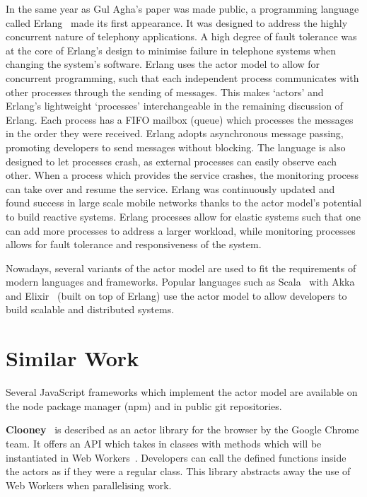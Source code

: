 \documentclass[12pt, a4paper]{report}
\theoremstyle{definition}
\theoremstyle{definition}%
\theoremstyle{definition}%
\theoremstyle{definition}%
\theoremstyle{definition}%
\theoremstyle{definition}%
\begin{document}
In the same year as Gul Agha's paper was made public, a programming language called Erlang~\cite{erlang} made its first appearance. It was designed to address the highly concurrent nature of telephony applications. A high degree of fault tolerance was at the core of Erlang's design to minimise failure in telephone systems when changing the system's software. Erlang uses the actor model to allow for concurrent programming, such that each independent process communicates with other processes through the sending of messages. This makes `actors' and Erlang's lightweight `processes' interchangeable in the remaining discussion of Erlang. Each process has a FIFO mailbox (queue) which processes the messages in the order they were received. Erlang adopts asynchronous message passing, promoting developers to send messages without blocking. The language is also designed to let processes crash, as external processes can easily observe each other. When a process which provides the service crashes, the monitoring process can take over and resume the service. Erlang was continuously updated and found success in large scale mobile networks thanks to the actor model's potential to build reactive systems\cite{reactivemanifesto}. Erlang processes allow for elastic systems such that one can add more processes to address a larger workload, while monitoring processes allows for fault tolerance and responsiveness of the system. 

Nowadays, several variants of the actor model are used to fit the requirements of modern languages and frameworks. Popular languages such as Scala~\cite{scala} with Akka~\cite{akka} and Elixir~\cite{elixir} (built on top of Erlang) use the actor model to allow developers to build scalable and distributed systems.

\section{Similar Work}
Several JavaScript frameworks which implement the actor model are available on the node package manager (npm) and in public git repositories.

\textbf{Clooney}~\cite{clooney} is described as an actor library for the browser by the Google Chrome team. It offers an API which takes in classes with methods which will be instantiated in Web Workers~\cite{webworkers}. Developers can call the defined functions inside the actors as if they were a regular class. This library abstracts away the use of Web Workers when parallelising work.
\end{document}
